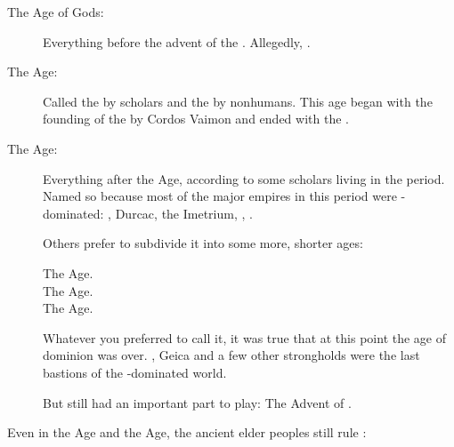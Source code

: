 \begin{description}
  \item[The Age of Gods:] 
    Everything before the advent of the \VaimonCaliphate. 
    Allegedly, .
  
  \item[The \Human Age:]
    Called the  by \human{} scholars and the  by nonhumans. 
    This age began with the founding of the \VaimonCaliphate by Cordos Vaimon and ended with the \Darkfall. 
  
  \item[The \Scatha Age:]
    Everything after the \Human{} Age, according to some \scathaese{} scholars living in the period. 
    Named so because most of the major empires in this period were \scatha-dominated:
    \Ortaica, Durcac, the Imetrium, \Tepharae{}, \Velcad. 
    
    Others prefer to subdivide it into some more, shorter ages:
    
    \begin{description}
      \item[The \Ortaican Age.]
      \item[The \Tepharin Age.]
      \item[The \Velcadian Age.]
    \end{description}
    
    Whatever you preferred to call it, it was true that at this point the age of \human{} dominion was over. 
    \Redce, Geica and a few other strongholds were the last bastions of the \human-dominated world. 
    
    But \humanity{} still had an important part to play: 
    The Advent of . 
\end{description}

Even in the \Human Age and the \Scatha Age, the ancient elder peoples still rule \Miith:

















